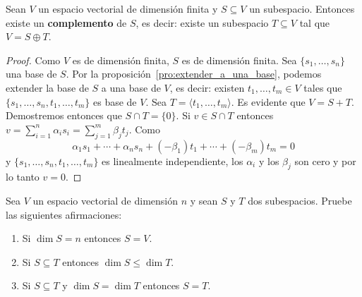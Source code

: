 \begin{cor}
    Sean $V$ un espacio vectorial de dimensión finita y $S\subseteq V$ un
    subespacio. Entonces existe un \textbf{complemento} de $S$, es decir:
    existe un subespacio $T\subseteq V$ tal que $V=S\oplus T$. 

	\begin{proof}
		Como $V$ es de dimensión finita, $S$ es de dimensión finita. Sea
		$\{s_1,\dots,s_n\}$ una base de $S$.  Por la
		proposición~\ref{pro:extender_a_una_base}, podemos extender la base de
		$S$ a una base de $V$, es decir: existen $t_1,\dots,t_m\in V$ tales que
		$\{s_1,\dots,s_n,t_1,\dots,t_m\}$ es base de $V$.  Sea $T=\langle
		t_1,\dots,t_m\rangle$. Es evidente que $V=S+T$. Demostremos entonces que $S\cap
		T=\{0\}$. Si $v\in S\cap T$ entonces $v=\sum_{i=1}^n
		\alpha_is_i=\sum_{j=1}^m \beta_jt_j$. Como 
		\[
			\alpha_1s_1+\cdots+\alpha_ns_n+(-\beta_1)t_1+\cdots+(-\beta_m)t_m=0
		\]
		y $\{s_1,\dots,s_n,t_1,\dots,t_m\}$ es linealmente independiente, los
		$\alpha_i$ y los $\beta_j$ son cero y por lo tanto $v=0$. 
	\end{proof}
\end{cor}


\begin{xca}
	Sea $V$ un espacio vectorial de dimensión $n$ y sean $S$ y $T$ dos
	subespacios. Pruebe las siguientes afirmaciones:
	\begin{enumerate}
		\item Si $\dim S=n$ entonces $S=V$.
		\item Si $S\subseteq T$ entonces $\dim S\leq \dim T$.
		\item Si $S\subseteq T$ y $\dim S=\dim T$ entonces $S=T$.
	\end{enumerate}
\end{xca}

